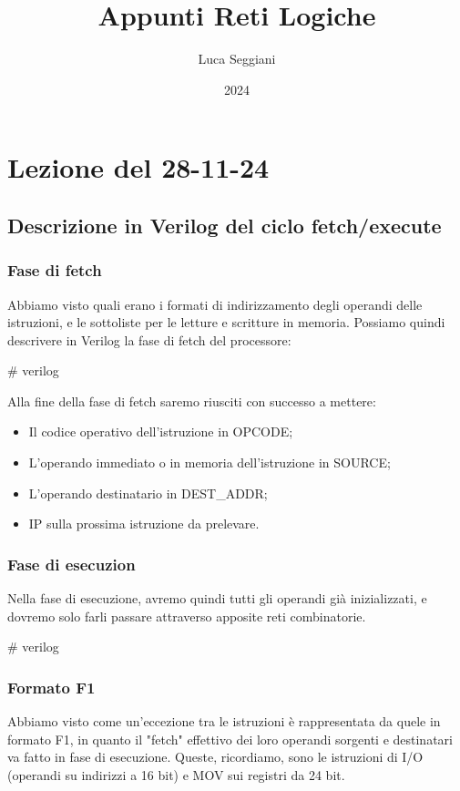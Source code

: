 \documentclass[a4paper,11pt]{article}
\title{Appunti Reti Logiche}
\author{Luca Seggiani}
\date{2024}
\begin{document}
\section{Lezione del 28-11-24}

\thispagestyle{empty}
\pagestyle{fancy}

\subsection{Descrizione in Verilog del ciclo fetch/execute}
\subsubsection{Fase di fetch} 
Abbiamo visto quali erano i formati di indirizzamento degli operandi delle istruzioni, e le sottoliste per le letture e scritture in memoria. 
Possiamo quindi descrivere in Verilog la fase di fetch del processore:

# verilog

Alla fine della fase di fetch saremo riusciti con successo a mettere:
\begin{itemize}
	\item Il codice operativo dell'istruzione in OPCODE;
	\item L'operando immediato o in memoria dell'istruzione in SOURCE;
	\item L'operando destinatario in DEST\_ADDR;
	\item IP sulla prossima istruzione da prelevare.
\end{itemize}

\subsubsection{Fase di esecuzion}
Nella fase di esecuzione, avremo quindi tutti gli operandi già inizializzati, e dovremo solo farli passare attraverso apposite reti combinatorie.

# verilog

\subsubsection{Formato F1}
Abbiamo visto come un'eccezione tra le istruzioni è rappresentata da quele in formato F1, in quanto il "fetch" effettivo dei loro operandi sorgenti e destinatari va fatto in fase di esecuzione.
Queste, ricordiamo, sono le istruzioni di I/O (operandi su indirizzi a 16 bit) e MOV sui registri da 24 bit.
\end{document}
